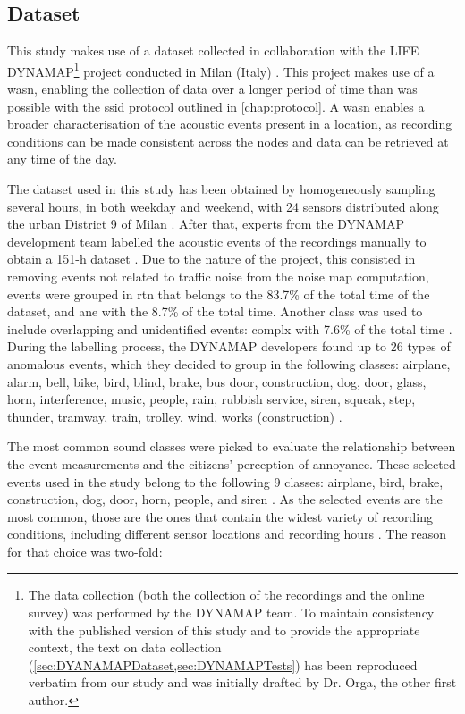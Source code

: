 \subsection{Dataset}
\label{sec:DYANAMAPDataset}
This study makes use of a dataset collected in collaboration with the LIFE DYNAMAP\footnote{The data collection (both the collection of the recordings and the online survey) was performed by the DYNAMAP team. To maintain consistency with the published version of this study and to provide the appropriate context, the text on data collection (\cref{sec:DYANAMAPDataset,sec:DYNAMAPTests}) has been reproduced verbatim from our study \citep{Orga2021Multilevel} and was initially drafted by Dr. Orga, the other first author.} project conducted in Milan (Italy) \citep{Sevillano2016DYNAMAP,Alias2020WASN}. This project makes use of a \gls{wasn}, enabling the collection of data over a longer period of time than was possible with the \gls{ssid} protocol outlined in \cref{chap:protocol}. A \gls{wasn} enables a broader characterisation of the acoustic events present in a location, as recording conditions can be made consistent across the nodes and data can be retrieved at any time of the day.

The dataset used in this study has been obtained by homogeneously sampling several hours, in both weekday and weekend, with 24 sensors distributed along the urban District 9 of Milan \citep{AlsinaPages2018Detection}. After that, experts from the DYNAMAP development team labelled the acoustic events of the recordings manually to obtain a 151-h dataset \citep{Alias2020WASN}. Due to the nature of the project, this consisted in removing events not related to traffic noise from the noise map computation, events were grouped in \gls{rtn} that belongs to the 83.7\% of the total time of the dataset, and \gls{ane} with the 8.7\% of the total time. Another class was used to include overlapping and unidentified events: \gls{complx} with 7.6\% of the total time \citep{Alias2020Aggregate}. During the labelling process, the DYNAMAP developers found up to 26 types of anomalous events, which they decided to group in the following classes: airplane, alarm, bell, bike, bird, blind, brake, bus door, construction, dog, door, glass, horn, interference, music, people, rain, rubbish service, siren, squeak, step, thunder, tramway, train, trolley, wind, works (construction) \citep{Alias2017Description}.

The most common sound classes were picked to evaluate the relationship between the event measurements and the citizens' perception of annoyance. These selected events used in the study belong to the following 9 classes: airplane, bird, brake, construction, dog, door, horn, people, and siren \citep{Orga2017Impact}. As the selected events are the most common, those are the ones that contain the widest variety of recording conditions, including different sensor locations and recording hours \citep{LabairuTrenchs2018Noise}. The reason for that choice was two-fold:

